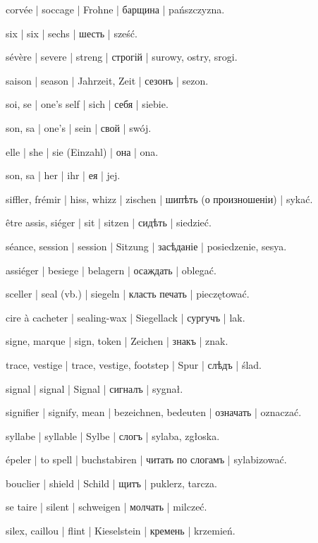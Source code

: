 \begin{outdent}{1em}
corvée | soccage | Frohne | барщина | pańszczyzna.

six | six | sechs | шесть | sześć.

sévère | severe | streng | строгій | surowy, ostry, srogi.

saison | season | Jahrzeit, Zeit | сезонъ | sezon.

soi, se | one’s self | sich | себя | siebie.

\uvsubentry{}
son, sa | one’s | sein | свой | swój.

elle | she | sie (Einzahl) | она | ona.

\uvsubentry{}
son, sa | her | ihr | ея | jej.

siffler, frémir | hiss, whizz | zischen | шипѣть (о
произношеніи) | sykać.

être assis, siéger | sit | sitzen | сидѣть | siedzieć.

\uvsubentry{}
séance, session | session | Sitzung | засѣданіе | posiedzenie, sesya.

assiéger | besiege | belagern | осаждать | oblegać.

sceller | seal (vb.) | siegeln | класть печать | pieczętować.

\uvsubentry{}
cire à cacheter | sealing-wax | Siegellack | сургучъ | lak.

signe, marque | sign, token | Zeichen | знакъ | znak.

\uvsubentry{}
trace, vestige | trace, vestige, footstep | Spur | слѣдъ | ślad.

signal | signal | Signal | сигналъ | sygnał.

signifier | signify, mean | bezeichnen, bedeuten | означать | oznaczać.

syllabe | syllable | Sylbe | слогъ | sylaba, zgłoska.

\uvsubentry{}
épeler | to spell | buchstabiren | читать по слогамъ | sylabizować.

bouclier | shield | Schild | щитъ | puklerz, tarcza.

se taire | silent | schweigen | молчать | milczeć.

silex, caillou | flint | Kieselstein | кремень | krzemień.


\end{outdent}
